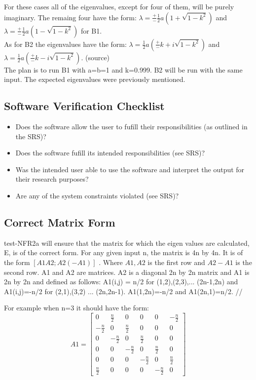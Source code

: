 \documentclass[12pt, titlepage]{article}
\begin{document}
For these cases all of the eigenvalues, except for four of them, will be purely 
imaginary. The remaing four have the form: $\lambda = \frac{+}{-} \frac{1}{2} a 
(1+\sqrt{1-k^{2}})$ and $\lambda = \frac{+}{-} \frac{1}{2} a 
(1-\sqrt{1-k^{2}})$ for B1. \\ 
As for B2 the eigenvalues have the form:  $\lambda =  \frac{1}{2} a 
(\frac{+}{-}k+ i \sqrt{1-k^{2}})$ and $\lambda = \frac{1}{2} a 
(\frac{+}{-}k - i \sqrt{1-k^{2}})$. (source) \\ 
The plan is to run B1 with a=b=1 and k=0.999. B2 will be run with the same 
input. The expected eigenvalues were previously mentioned. 

\subsection{Software Verification Checklist} 

\begin{itemize}
	\item Does the software allow the user to fufill their responsibilities 
	(as outlined in the SRS)?
	\item Does the software fufill its intended responsibilities (see SRS)?
	\item Was the intended user able to use the software and interpret the 
	output for their research purposes?
	\item Are any of the system constraints violated (see SRS)?
\end{itemize}  

\newpage	
\subsection{Correct Matrix Form} 

test-NFR2a will ensure that the matrix for which the eigen values are 
calculated, E, is of the correct form. For any given input n, the matrix is 4n 
by 4n. It is of the form $ [A1 A2; A2 (-A1)] $ . Where $ A1, A2$ is the first 
row 
and $A2 -A1$ is the second row. A1 and A2 are matrices. A2 is a diagonal 2n by 
2n matrix and A1 is 2n by 2n and defined as follows: A1(i,j) = n/2 for 
(1,2),(2,3),... (2n-1,2n) and A1(i,j)=-n/2 for (2,1),(3,2) ... (2n,2n-1). 
A1(1,2n)=-n/2 and A1(2n,1)=n/2. // 

For example when n=3 it should have the form: 
\[
A1=
\begin{bmatrix}
0 & \frac{n}{2} & 0 & 0 & 0 &-\frac{n}{2}\\
-\frac{n}{2} & 0 & \frac{n}{2} & 0 & 0 &0\\
0 & -\frac{n}{2} & 0 & \frac{n}{2} & 0 &0\\
0 & 0 & -\frac{n}{2} & 0 & \frac{n}{2} &0\\
0 & 0 & 0 & -\frac{n}{2} & 0 &\frac{n}{2} \\ 
\frac{n}{2} & 0 & 0 & 0 & -\frac{n}{2} & 0 
\end{bmatrix}
\] 
\end{document}
